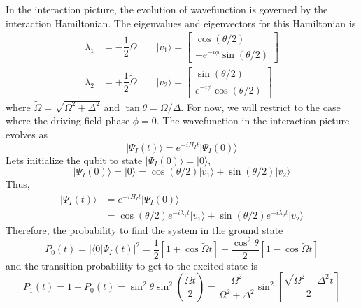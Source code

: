 \documentclass[aps,prl,onecolumn,notitlepage,showpacs,floatfix,superscriptaddress]{revtex4-1}
\begin{document}
In the interaction picture, the evolution of wavefunction is governed by the interaction Hamiltonian. The eigenvalues and eigenvectors for this Hamiltonian is
\begin{equation}
\begin{split}
\lambda_1 &= -\dfrac{1}{2} \tilde{\Omega} \qquad \vert v_1 \rangle = \left[ \begin{array}{c}
\cos(\theta/2)  \\ 
-e^{-i\phi} \sin(\theta/2)
\end{array} \right] \\
\lambda_2 &= +\dfrac{1}{2} \tilde{\Omega} \qquad \vert v_2 \rangle = \left[ \begin{array}{c}
\sin(\theta/2)  \\ 
e^{-i\phi}\cos(\theta/2)
\end{array} \right] 
\end{split}
\end{equation}
where $\tilde{\Omega} = \sqrt{\Omega^2+\Delta^2}$ and $\tan\theta = \Omega/\Delta$. For now, we will restrict to the case where the driving field phase $\phi=0$. The wavefunction in the interaction picture evolves as
\begin{equation}
\vert \Psi_I(t) \rangle = e^{-iH_I t} \vert \Psi_I(0) \rangle
\end{equation}
Lets initialize the qubit to state $\vert \Psi_I(0) \rangle = \vert 0 \rangle$,
\begin{equation}
\vert \Psi_I(0) \rangle = \vert 0 \rangle = \cos(\theta/2) \vert v_1 \rangle + \sin(\theta/2) \vert v_2 \rangle 
\end{equation}
Thus,
\begin{equation}
\begin{split}
\vert \Psi_I(t) \rangle &= e^{-iH_I t} \vert \Psi_I(0) \rangle \\
&= \cos(\theta/2) e^{-i \lambda_1 t} \vert v_1 \rangle + \sin(\theta/2) e^{-i \lambda_2 t} \vert v_2 \rangle
\end{split}
\end{equation}
Therefore, the probability to find the system in the ground state
\begin{equation}
P_0 (t) = \vert \langle 0 \vert \Psi_I(t) \vert^2 = \dfrac{1}{2} [1+\cos\tilde{\Omega}t] + \dfrac{\cos^2\theta}{2} [1-\cos\tilde{\Omega}t]
\end{equation}
and the transition probability to get to the excited state is
\begin{equation}
P_1 (t) = 1-P_0 (t) = \sin^2\theta \sin^2\left( \dfrac{\tilde{\Omega}t}{2}\right) = \dfrac{\Omega^2}{\Omega^2+\Delta^2} \sin^2 \left[\dfrac{\sqrt{\Omega^2+\Delta^2}t}{2} \right]
\end{equation}
\end{document}
